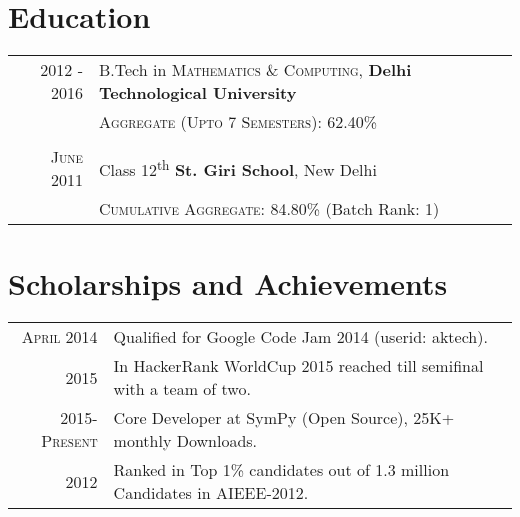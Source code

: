 \documentclass[a4paper,10pt]{article}
\begin{document}
\section{Education}
\begin{tabular}{rl}	
 \textsc{2012} - 2016 & B.Tech in \textsc{Mathematics \& Computing}, \textbf{Delhi Technological University}\\
&\normalsize \textsc{Aggregate (Upto 7 Semesters)}: 62.40\%\\&\\

\textsc{June} 2011& Class 12\textsuperscript{th} \textbf{St. Giri School}, New Delhi\\
&\normalsize \textsc{Cumulative Aggregate}: 84.80\% (Batch Rank: 1)\\

\end{tabular}

\section{Scholarships and Achievements}
\begin{tabular}{rl}
 \textsc{April} 2014 & Qualified for Google Code Jam 2014 (userid: aktech).\\
 \textsc{2015} & In HackerRank WorldCup 2015 reached till semifinal with a team of two.\\
 \textsc{2015-Present} & Core Developer at SymPy (Open Source), 25K+ monthly Downloads.\\
 \textsc{2012} & Ranked in Top 1\% candidates out of 1.3 million Candidates in AIEEE-2012.\\
\end{tabular}

\end{document}

